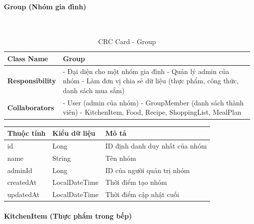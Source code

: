 \paragraph{Group (Nhóm gia đình)} ~\\

\begin{table}[H]
\small
\renewcommand{\arraystretch}{1.3}
\begin{tabularx}{\textwidth}{|>{\raggedright\arraybackslash}p{3.5cm}|X|}
\hline
\rowcolor{gray!20}
\textbf{Class Name} & Group \\
\hline
\textbf{Responsibility} & - Đại diện cho một nhóm gia đình \newline - Quản lý admin của nhóm \newline - Làm đơn vị chia sẻ dữ liệu (thực phẩm, công thức, danh sách mua sắm) \\
\hline
\textbf{Collaborators} & - User (admin của nhóm) \newline - GroupMember (danh sách thành viên) \newline - KitchenItem, Food, Recipe, ShoppingList, MealPlan \\
\hline
\end{tabularx}
\caption{CRC Card - Group}
\end{table}

\begin{table}[H]
\small
\renewcommand{\arraystretch}{1.3}
\begin{tabularx}{\textwidth}{|>{\raggedright\arraybackslash}p{3cm}|>{\raggedright\arraybackslash}p{3cm}|X|}
\hline
\rowcolor{gray!20}
\textbf{Thuộc tính} & \textbf{Kiểu dữ liệu} & \textbf{Mô tả} \\
\hline
id & Long & ID định danh duy nhất của nhóm \\
\hline
name & String & Tên nhóm \\
\hline
adminId & Long & ID của người quản trị nhóm \\
\hline
createdAt & LocalDateTime & Thời điểm tạo nhóm \\
\hline
updatedAt & LocalDateTime & Thời điểm cập nhật cuối \\
\hline
\end{tabularx}
\end{table}

\paragraph{KitchenItem (Thực phẩm trong bếp)} ~\\

